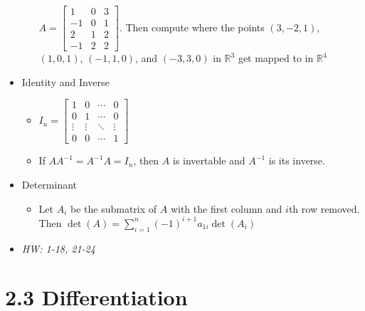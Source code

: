 \documentclass[11pt]{article}
\theoremstyle{plain}
\theoremstyle{definition}
\theoremstyle{remark}
\newcommand{\<}{\langle}
\renewcommand{\>}{\rangle}
\newcommand{\mb}{\mathbb}
\begin{document}
\begin{itemize}
\begin{itemize}
        \(
          A =
          \begin{bmatrix}
             1 &  0 &  3 \\
            -1 &  0 &  1 \\
             2 &  1 &  2 \\
            -1 &  2 &  2
          \end{bmatrix}
        \). Then compute where the points
          \((3,-2,1)\),
          \((1,0,1)\),
          \((-1,1,0)\), and
          \((-3,3,0)\)
        in \(\mb R^3\) get
        mapped to in \(\mb R^4\)
    \end{itemize}
  \item Identity and Inverse
    \begin{itemize}
      \item
        \(
          I_n =
          \begin{bmatrix}
            1      & 0      & \cdots & 0      \\
            0      & 1      & \cdots & 0      \\
            \vdots & \vdots & \ddots & \vdots \\
            0      & 0      & \cdots & 1
          \end{bmatrix}
        \)
      \item
        If \(AA^{-1}=A^{-1}A=I_n\), then \(A\) is invertable and
        \(A^{-1}\) is its inverse.
    \end{itemize}
  \item Determinant
    \begin{itemize}
      \item Let \(A_i\) be the submatrix of \(A\) with the first column
      and \(i\)th row removed. Then
        \(
          \det(A)
            =
          \sum_{i=1}^n
          (-1)^{i+1}
          a_{1i}\det(A_i)
        \)
    \end{itemize}
  \item\textit{
    HW: 1-18, 21-24
  }
\end{itemize}


\section*{2.3 Differentiation}
\end{document}
